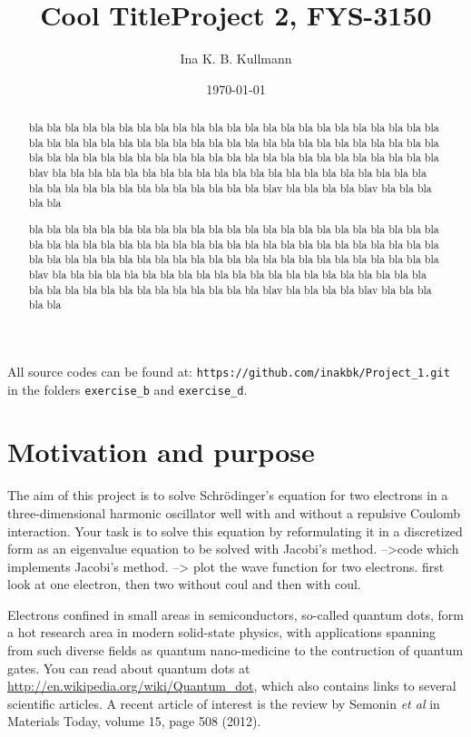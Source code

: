 \documentclass[11pt,a4wide]{article}
\title{{\Huge {\bf Cool Title}}\linebreak \small{Project 2, FYS-3150}}
\author{Ina K. B. Kullmann}
\date{\today}
\begin{document}
\maketitle

{\scriptsize \noindent All source codes can be found at: \texttt{https://github.com/inakbk/Project\_1.git} in the folders \texttt{exercise\_b} and \texttt{exercise\_d}. }

\tableofcontents
\newpage

\begin{abstract}
bla bla bla bla bla bla bla bla bla bla bla bla bla bla bla bla bla bla bla bla bla bla bla bla bla bla bla bla bla bla bla bla bla bla bla bla bla bla bla bla bla bla bla bla bla bla bla bla bla bla bla bla bla bla bla bla bla bla bla bla bla bla bla bla bla bla bla bla bla blav bla bla bla bla bla bla bla bla bla bla bla bla bla bla bla bla bla bla bla bla bla bla bla bla bla bla bla bla bla bla bla bla bla bla blav bla bla bla bla blav bla bla bla bla bla

bla bla bla bla bla bla bla bla bla bla bla bla bla bla bla bla bla bla bla bla bla bla bla bla bla bla bla bla bla bla bla bla bla bla bla bla bla bla bla bla bla bla bla bla bla bla bla bla bla bla bla bla bla bla bla bla bla bla bla bla bla bla bla bla bla bla bla bla bla blav bla bla bla bla bla bla bla bla bla bla bla bla bla bla bla bla bla bla bla bla bla bla bla bla bla bla bla bla bla bla bla bla bla bla blav bla bla bla bla blav bla bla bla bla bla
\end{abstract}


\section{Motivation and purpose}
The aim of this project is to solve Schr\"odinger's equation for two electrons in a three-dimensional harmonic oscillator well with and without a repulsive Coulomb interaction.  Your task is to solve this equation by reformulating it in a discretized form as an eigenvalue equation to be solved with Jacobi's method. -->code which implements Jacobi's method. --> plot the wave function for two electrons. first look at one electron, then two without coul and then with coul.

Electrons confined in small areas in semiconductors, so-called quantum dots, form a hot research area in modern solid-state physics, with applications spanning from such diverse fields as quantum nano-medicine to the contruction of quantum gates. You can read about quantum dots at \url{http://en.wikipedia.org/wiki/Quantum_dot}, which also contains links to several scientific articles. A recent article of interest is the review by Semonin {\em et al} in Materials Today, volume 15, page 508 (2012).
\end{document}
